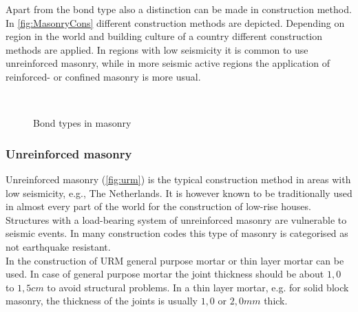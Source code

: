 Apart from the bond type also a distinction can be made in construction method. In \autoref{fig:MasonryCons} different construction methods are depicted. Depending on region in the world and building culture of a country different construction methods are applied. In regions with low seismicity it is common to use unreinforced masonry, while in more seismic active regions the application of reinforced- or confined masonry is more usual.

\begin{figure}[!htb]
    \centering
     \hfill
     \hfill
     \hspace{3em}\\
     \hfill
     \hfill
    \caption{Bond types in masonry \cite{barraza2012numerical}}
    \label{fig:Masonry}
\end{figure}

\subsubsection{Unreinforced masonry}
Unreinforced masonry (\autoref{fig:urm}) is the typical construction method in areas with low seismicity, e.g., The Netherlands. It is however known to be traditionally used in almost every part of the world for the construction of low-rise houses. Structures with a load-bearing system of unreinforced masonry are vulnerable to seismic events. In many construction codes this type of masonry is categorised as not earthquake resistant.\\

In the construction of URM general purpose mortar or thin layer mortar can be used. In case of general purpose mortar the joint thickness should be about $1,0$ to $1,5 cm$ to avoid structural problems. In a thin layer mortar, e.g. for solid block masonry, the thickness of the joints is usually $1,0$ or $2,0 mm$ thick.
